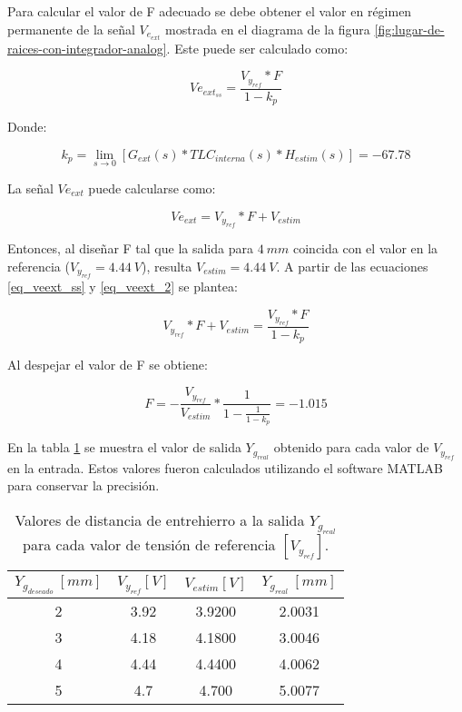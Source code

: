 Para calcular el valor de F adecuado se debe obtener el valor en régimen permanente de la señal $V_{e_{ext}}$ mostrada en el diagrama de la figura \ref{fig:lugar-de-raices-con-integrador-analog}. Este puede ser calculado como:

\begin{equation} \label{eq_veext_ss}
	Ve_{ext_{ss}}=\frac{V_{y_{ref}}*F}{1-k_p}
\end{equation}

Donde: 

\begin{equation*}
	k_p=\lim\limits_{s \to 0}[G_{ext}(s)*TLC_{interna}(s)*H_{estim}(s)]=-67.78
\end{equation*}

La señal $Ve_{ext}$ puede calcularse como:

\begin{equation} \label{eq_veext_2}
	Ve_{ext}=V_{y_{ref}}*F+V_{estim}
\end{equation}

Entonces, al diseñar F tal que la salida para $4\:mm$ coincida con el valor en la referencia ($V_{y_{ref}}=4.44\:V$), resulta  $V_{estim}=4.44\:V$. A partir de las ecuaciones \ref{eq_veext_ss} y \ref{eq_veext_2} se plantea:

\begin{equation}
	V_{y_{ref}}*F+V_{estim}=\frac{V_{y_{ref}}*F}{1-k_p}
\end{equation}

Al despejar el valor de F se obtiene:

\begin{equation}
	F=-\frac{V_{y_{ref}}}{V_{estim}}*\frac{1}{1-\frac{1}{1-k_p}}=-1.015
\end{equation}


En la tabla \ref{tension-ref-vs-separacion-real} se muestra el valor de salida $Y_{g_{real}}$ obtenido para cada valor de $V_{y_{ref}}$ en la entrada. Estos valores fueron calculados utilizando el software MATLAB para conservar la precisión.

\begin{table}[H]
	\begin{center}
		\begin{tabular}{| c | c | c | c |}
			\hline
			$Y_{g_{deseado}}\:[mm]$ & $V_{y_{ref}}[V]$& $V_{estim}[V]$& $Y_{g_{real}}\:[mm]$\\ \hline
			2 &	3.92 & 3.9200 & 2.0031 \\ \hline
			3 & 4.18 & 4.1800 & 3.0046\\ \hline
			4 & 4.44 & 4.4400 & 4.0062 \\ \hline
			5 & 4.7 & 4.700 & 5.0077\\ \hline	
		\end{tabular}
		\caption{Valores de distancia de entrehierro a la salida $Y_{g_{real}}$ para cada valor de tensión de referencia $[V_{y_{ref}}]$.}
		\label{tension-ref-vs-separacion-real}
	\end{center}
\end{table}

